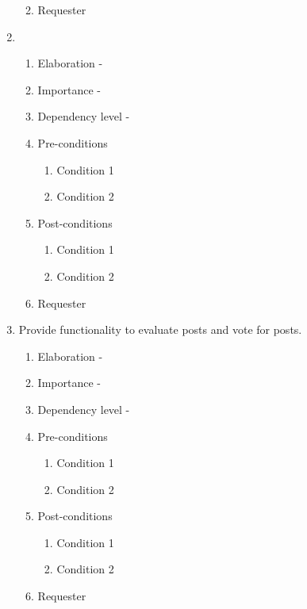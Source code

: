 \documentclass[12pt]{article}
\begin{document}
\begin{enumerate}
\begin{enumerate}
\begin{enumerate}
    \end{enumerate}
    \item Requester
  \end{enumerate}
\newpage %
   \item  %
  \begin{enumerate}
    \item Elaboration - 
    \item Importance - 
    \item Dependency level - 
    \item Pre-conditions
    \begin{enumerate}
    	\item Condition 1
    	\item Condition 2
    \end{enumerate}
        \item Post-conditions
    \begin{enumerate}
    	\item Condition 1
    	\item Condition 2
    \end{enumerate}
    \item Requester
  \end{enumerate}
\newpage %
   \item  Provide functionality to evaluate posts and vote for posts. %
  \begin{enumerate}
    \item Elaboration - 
    \item Importance - 
    \item Dependency level - 
    \item Pre-conditions
    \begin{enumerate}
    	\item Condition 1
    	\item Condition 2
    \end{enumerate}
        \item Post-conditions
    \begin{enumerate}
    	\item Condition 1
    	\item Condition 2
    \end{enumerate}
    \item Requester
  \end{enumerate}

\end{enumerate}
\end{document}
